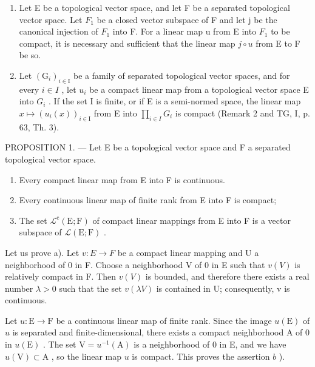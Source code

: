 \begin{enumerate}
\def\labelenumi{\arabic{enumi})}
\setcounter{enumi}{4}
\item
  Let E be a topological vector space, and let F be a separated topological vector space. Let \(F_{1}\) be a closed vector subspace of F and let j be the canonical injection of \(F_{1}\) into F. For a linear map u from E into \(F_{1}\) to be compact, it is necessary and sufficient that the linear map \(j \circ u\) from E to F be so.
\item
  Let \((\mathrm{G}_{i})_{i\in\mathrm{I}}\) be a family of separated topological vector spaces, and for every \(i\in I\) , let \(u_{i}\) be a compact linear map from a topological vector space E into \(G_{i}\) . If the set I is finite, or if E is a semi-normed space, the linear map \(x\mapsto(u_{i}(x))_{i\in\mathrm{I}}\) from E into \(\prod_{i\in I}G_{i}\) is compact (Remark 2 and TG, I, p. 63, Th. 3).
\end{enumerate}

PROPOSITION 1. --- Let E be a topological vector space and F a separated topological vector space.

\begin{enumerate}
\def\labelenumi{\alph{enumi})}
\item
  Every compact linear map from E into F is continuous.
\item
  Every continuous linear map of finite rank from E into F is compact;
\item
  The set \(\mathcal{L}^{\mathrm{c}}(\mathrm{E};\mathrm{F})\) of compact linear mappings from E into F is a vector subspace of \(\mathcal{L}(\mathrm{E};\mathrm{F})\) .
\end{enumerate}

Let us prove a). Let \(v: E \rightarrow F\) be a compact linear mapping and U a neighborhood of 0 in F. Choose a neighborhood V of 0 in E such that \(v(V)\) is relatively compact in F. Then \(v(V)\) is bounded, and therefore there exists a real number \(\lambda > 0\) such that the set \(v(\lambda V)\) is contained in U; consequently, v is continuous.

Let \(u \colon \mathrm{E} \to \mathrm{F}\) be a continuous linear map of finite rank. Since the image \(u(\mathrm{E})\) of \(u\) is separated and finite-dimensional, there exists a compact neighborhood A of 0 in \(u(\mathrm{E})\) . The set \(\mathrm{V} = u^{-1}(\mathrm{A})\) is a neighborhood of 0 in E, and we have \(u(\mathrm{V}) \subset \mathrm{A}\) , so the linear map \(u\) is compact. This proves the assertion \(b\) ).

